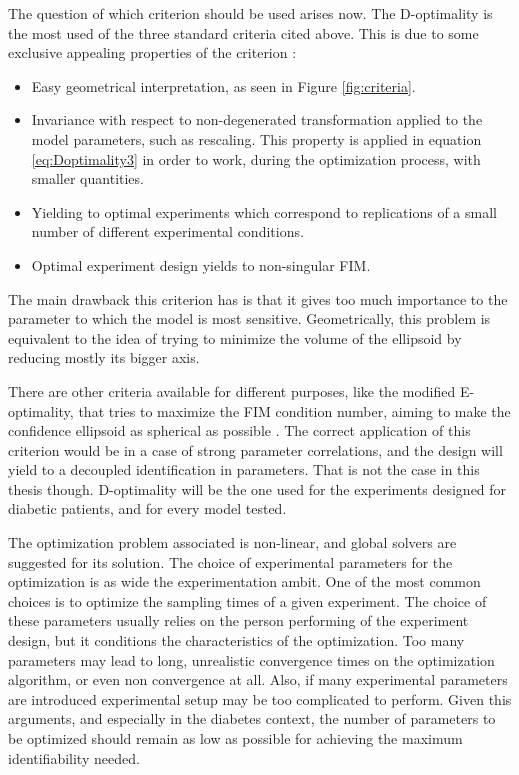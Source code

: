 The question of which criterion should be used arises now. The D-optimality is the most used of the three standard criteria cited above. This is due to some exclusive appealing properties of the criterion \cite{franceschini2008model}:
\begin{itemize}
	\item Easy geometrical interpretation, as seen in Figure \ref{fig:criteria}.
	\item Invariance with respect to non-degenerated transformation applied to the model parameters, such as rescaling. This property is applied in equation \ref{eq:Doptimality3} in order to work, during the optimization process, with smaller quantities.
	\item Yielding to optimal experiments which correspond to replications of a small number of different experimental conditions.
	\item Optimal experiment design yields to non-singular FIM.
\end{itemize}
The main drawback this criterion has is that it gives too much importance to the parameter to which the model is most sensitive. Geometrically, this problem is equivalent to the idea of trying to minimize the volume of the ellipsoid by reducing mostly its bigger axis.

There are other criteria available for different purposes, like the modified E-optimality, that tries to maximize the FIM condition number, aiming to make the confidence ellipsoid as spherical as possible \cite{versyck1998optimal}. The correct application of this criterion would be in a case of strong parameter correlations, and the design will yield to a decoupled identification in parameters. That is not the case in this thesis though. D-optimality will be the one used for the experiments designed for diabetic patients, and for every model tested.

The optimization problem associated is non-linear, and global solvers are suggested for its solution. The choice of experimental parameters for the optimization is as wide the experimentation ambit. One of the most common choices is to optimize the sampling times of a given experiment. The choice of these parameters usually relies on the person performing of the experiment design, but it conditions the characteristics of the optimization. Too many parameters may lead to long, unrealistic convergence times on the optimization algorithm, or even non convergence at all. Also, if many experimental parameters are introduced experimental setup may be too complicated to perform. Given this arguments, and especially in the diabetes context, the number of parameters to be optimized should remain as low as possible for achieving the maximum identifiability needed.

